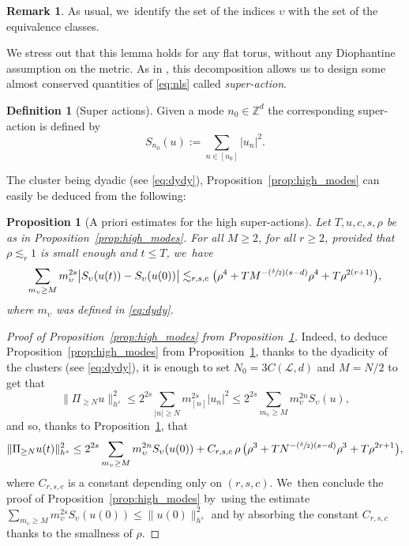 \documentclass[JEP,XML,SOM,Unicode,published]{cedram}
\newcommand{\Psfrac}[2]{(\sfrac{#1}{#2})}
\theoremstyle{plain}
\newtheorem{proposition}[theorem]{Proposition}
\theoremstyle{definition}
\newtheorem{definition}[theorem]{Definition}
\newtheorem{remark}[theorem]{Remark}
\newcommand{\1}{\mathbf{1}}
\begin{document}
\begin{remark}
As usual, we~identify the set of the indices $\upsilon$ with the set of the equivalence classes.
\end{remark}

We stress out that this lemma holds for any flat torus, without any Diophantine assumption on the metric. As in \cite{BFM22}, this decomposition allows us to design some almost conserved quantities of \eqref{eq:nls} called \emph{super-action}.

\begin{definition}[Super actions] \label{def:super_actions} Given a mode $n_0\in \mathbb{Z}^d$ the corresponding super-action is defined by
\[
S_{n_0}(u) := \sum_{n\in[n_{0}]} |u_n|^2.
\]
\end{definition}

The cluster being dyadic (see \eqref{eq:dydy}), Proposition~\ref{prop:high_modes} can easily be deduced from the following:
\begin{proposition}[A priori estimates for the high super-actions]\label{prop:ap-hi} Let $T,u,c,s,\rho$ be as in Proposition~\ref{prop:high_modes}. For all $M \geq 2$,
for all $r\geq2$, provided that $\rho\lesssim_r 1$ is small enough and $t\leq T$, we~have
\begin{equation}
\label{eq:ap-hi}
\sum_{m_\upsilon \geq M} m_\upsilon^{2s} \big|S_{\upsilon}(u(t))-S_{\upsilon}(u(0))\big|
\lesssim_{r,s,c} \bigl(\rho^4 + TM^{-\Psfrac{\delta}{2}(s-d)} \rho^{4}+T \rho^{2(r+1)}\bigr),
\end{equation}
where $m_{\upsilon}$ was defined in \eqref{eq:dydy}.
\end{proposition}

\begin{proof}[Proof of Proposition~\ref{prop:high_modes} from Proposition~\ref{prop:ap-hi}] Indeed, to deduce Proposition~\ref{prop:high_modes} from Proposition~\ref{prop:ap-hi}, thanks to the dyadicity of the clusters (see \eqref{eq:dydy}), it is enough to set $N_0 = 3C(\mathscr{L},d)$ and $M=N/2$ to get that
\[
\| \Pi_{\geq N} u \|_{h^s}^2 \leq 2^{2s} \sum_{|n|\geq N} m_{[n]}^{2s} |u_n|^2 \leq 2^{2s} \sum_{ m_\upsilon \geq M} m_\upsilon^{2n} S_\upsilon(u),
\]
and so, thanks to Proposition~\ref{prop:ap-hi}, that
\[
\| \Pi_{\geq N} u(t) \|_{h^s}^2 \leq 2^{2s} \sum_{ m_\upsilon \geq M} m_\upsilon^{2n} S_\upsilon(u(0)) + C_{r,s,c} \, \rho \, \bigl(\rho^3 + TN^{-\Psfrac{\delta}{2}(s-d)} \rho^{3}+T \rho^{2r+1}\bigr),
\]
where $C_{r,s,c}$ is a constant depending only on $(r,s,c)$. We~then conclude the proof of Proposition~\ref{prop:high_modes} by~using the estimate $\sum_{ m_\upsilon \geq M} m_\upsilon^{2s} S_\upsilon(u(0)) \leq \|u(0) \|_{h^s}^2$ and by absorbing the constant $C_{r,s,c} $ thanks to the smallness of $\rho$.
\end{proof}
\end{document}
